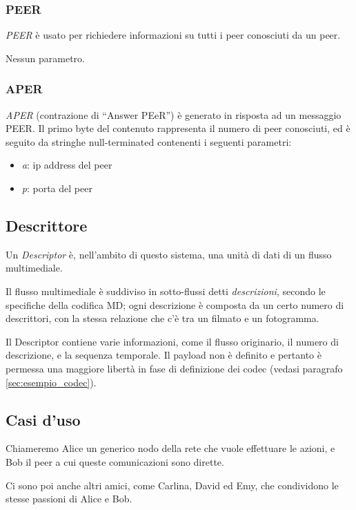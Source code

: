 \subsubsection*{PEER}
\emph{PEER} è usato per richiedere
informazioni su tutti i peer conosciuti da un peer.

Nessun parametro.


\subsubsection*{APER}
%
\emph{APER} (contrazione di ``Answer PEeR'') è generato in
risposta ad un messaggio PEER. Il primo byte del contenuto rappresenta il
numero di peer conosciuti, ed è seguito da stringhe null-terminated contenenti i
seguenti parametri:
\begin{itemize}
  \item \emph{a}: ip address del peer
  \item \emph{p}: porta del peer
\end{itemize}



\subsection{Descrittore}


Un \emph{Descriptor} è, nell'ambito di questo sistema, una unità di dati di un
flusso multimediale.

Il flusso multimediale è suddiviso in sotto-flussi detti \emph{descrizioni},
secondo le specifiche della codifica MD; ogni descrizione è composta da un certo numero
di descrittori, con la stessa relazione che c'è tra un filmato e un fotogramma.

Il Descriptor contiene varie informazioni, come il flusso originario, il numero
di descrizione, e la sequenza temporale. Il payload non è definito e pertanto è
permessa una maggiore libertà in fase di definizione dei codec (vedasi
paragrafo \ref{sec:esempio_codec}).

\subsection{Casi d'uso}

Chiameremo Alice un generico nodo della rete che vuole effettuare le azioni, e
Bob il peer a cui queste comunicazioni sono dirette.

Ci sono poi anche altri amici, come Carlina, David ed Emy, che condividono le
stesse passioni di Alice e Bob.


